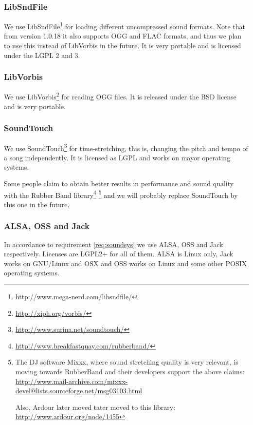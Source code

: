 \subsubsection{LibSndFile}

We use LibSndFile\footnote{\url{http://www.mega-nerd.com/libsndfile/}} for
loading different uncompressed sound formats. Note that from version
1.0.18 it also supports OGG and FLAC formats, and thus we plan to use
this instead of LibVorbis in the future. It is very portable and is
licensed under the LGPL 2 and 3.

\subsubsection{LibVorbis}

We use LibVorbis\footnote{\url{http://xiph.org/vorbis/}} for reading
OGG files. It is released under the BSD license and is very portable.

\subsubsection{SoundTouch}

We use SoundTouch\footnote{\url{http://www.surina.net/soundtouch/}}
for time-stretching, this is, changing the pitch and tempo of a song
independently. It is licensed as LGPL and works on mayor operating
systems.

Some people claim to obtain better results in performance and sound
quality with the Rubber Band
library\footnote{\url{http://www.breakfastquay.com/rubberband/}}
\footnote{The DJ software Mixxx, where sound stretching quality is
  very relevant, is moving towards RubberBand and their developers
  support the above claims:
  \url{http://www.mail-archive.com/mixxx-devel@lists.sourceforge.net/msg03103.html}

  Also, Ardour later moved tater moved to this library:
  \url{http://www.ardour.org/node/1455}} and we will probably replace
SoundTouch by this one in the future.

\subsubsection{ALSA, OSS and Jack}

In accordance to requirement \ref{req:soundsys} we use ALSA, OSS and
Jack respectively. Licenses are LGPL2+ for all of them. ALSA is Linux
only, Jack works on GNU/Linux and OSX and OSS works on Linux and some
other POSIX operating systems.

